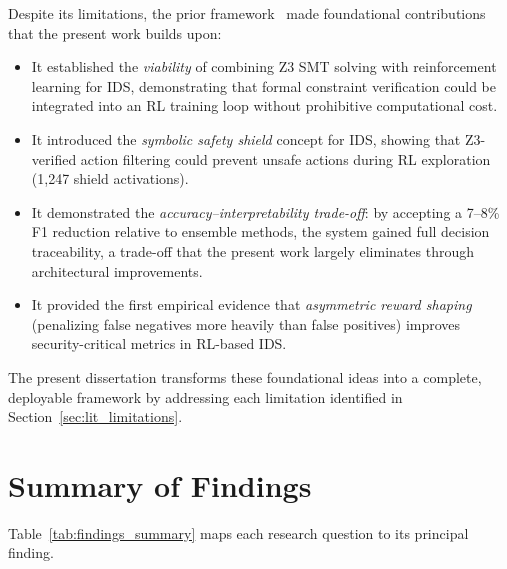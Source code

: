 \documentclass[12pt, letterpaper, oneside]{report}
\begin{document}
Despite its limitations, the prior framework~\cite{young2025adaptive} made foundational contributions that the present work builds upon:
\begin{itemize}
    \item It established the \emph{viability} of combining Z3 SMT solving with reinforcement learning for IDS, demonstrating that formal constraint verification could be integrated into an RL training loop without prohibitive computational cost.
    \item It introduced the \emph{symbolic safety shield} concept for IDS, showing that Z3-verified action filtering could prevent unsafe actions during RL exploration (1,247 shield activations).
    \item It demonstrated the \emph{accuracy--interpretability trade-off}: by accepting a 7--8\% F1 reduction relative to ensemble methods, the system gained full decision traceability, a trade-off that the present work largely eliminates through architectural improvements.
    \item It provided the first empirical evidence that \emph{asymmetric reward shaping} (penalizing false negatives more heavily than false positives) improves security-critical metrics in RL-based IDS.
\end{itemize}

The present dissertation transforms these foundational ideas into a complete, deployable framework by addressing each limitation identified in Section~\ref{sec:lit_limitations}.


\section{Summary of Findings}
\label{sec:findings_summary}

Table~\ref{tab:findings_summary} maps each research question to its principal finding.
\end{document}
